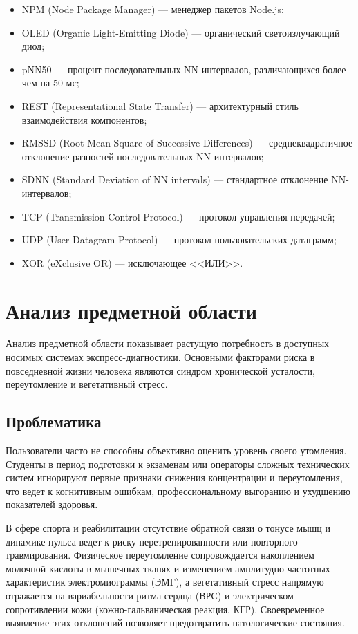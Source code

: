 \documentclass[utf8, russian]{eskdtext}
\begin{document}
\begin{itemize}[label={}, leftmargin=0pt, itemsep=0pt, parsep=2pt]
    \item NPM (Node Package Manager) --- менеджер пакетов Node.js;
    \item OLED (Organic Light-Emitting Diode) --- органический светоизлучающий диод;
    \item pNN50 --- процент последовательных NN-интервалов, различающихся более чем на 50 мс;
    \item REST (Representational State Transfer) --- архитектурный стиль взаимодействия компонентов;
    \item RMSSD (Root Mean Square of Successive Differences) --- среднеквадратичное отклонение разностей последовательных NN-интервалов;
    \item SDNN (Standard Deviation of NN intervals) --- стандартное отклонение NN-интервалов;
    \item TCP (Transmission Control Protocol) --- протокол управления передачей;
    \item UDP (User Datagram Protocol) --- протокол пользовательских датаграмм;
    \item XOR (eXclusive OR) --- исключающее <<ИЛИ>>.
\end{itemize}

\newpage

\section{Анализ предметной области}
Анализ предметной области показывает растущую потребность в доступных носимых системах экспресс-диагностики. Основными факторами риска в повседневной жизни человека являются синдром хронической усталости, переутомление и вегетативный стресс.

\subsection{Проблематика}
Пользователи часто не способны объективно оценить уровень своего утомления. Студенты в период подготовки к экзаменам или операторы сложных технических систем игнорируют первые признаки снижения концентрации и переутомления, что ведет к когнитивным ошибкам, профессиональному выгоранию и ухудшению показателей здоровья.

В сфере спорта и реабилитации отсутствие обратной связи о тонусе мышц и динамике пульса ведет к риску перетренированности или повторного травмирования. Физическое переутомление сопровождается накоплением молочной кислоты в мышечных тканях и изменением амплитудно-частотных характеристик электромиограммы (ЭМГ), а вегетативный стресс напрямую отражается на вариабельности ритма сердца (ВРС) и электрическом сопротивлении кожи (кожно-гальваническая реакция, КГР). Своевременное выявление этих отклонений позволяет предотвратить патологические состояния.
\end{document}
